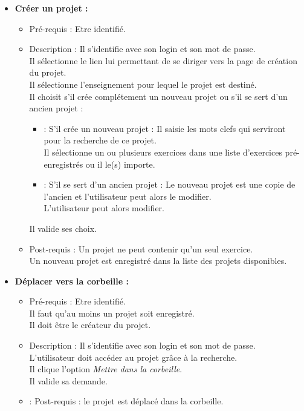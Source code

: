 \begin{itemize}
\item  {\bf Cr{\'e}er un projet :}
	\begin{itemize}
	\item Pr{\'e}-requis : Etre identifi{\'e}.
	\item Description : Il s'identifie avec son login et son mot de passe.\\
	Il s{\'e}lectionne le lien lui permettant de se diriger vers la page de cr{\'e}ation du projet.\\
	Il s{\'e}lectionne l'enseignement pour lequel le projet est destin{\'e}.\\
	Il choisit s'il cr{\'e}e compl{\'e}tement un nouveau projet ou s'il se sert d'un ancien projet :
	\begin{itemize}
		\item : S'il cr{\'e}e un nouveau projet : Il saisie les mots clefs qui serviront pour la recherche de ce projet.\\
		Il s{\'e}lectionne un ou plusieurs exercices dans une liste d'exercices pr{\'e}-enregistr{\'e}s ou il le(s) importe.
		\item : S'il se sert d'un ancien projet : Le nouveau projet est une copie de l'ancien et l'utilisateur peut alors le modifier.\\
		L'utilisateur peut alors modifier.
	\end{itemize}
	Il valide ses choix.
	\item Post-requis : Un projet ne peut contenir qu'un seul exercice.\\  
	Un nouveau projet est enregistr{\'e} dans la liste des projets disponibles.\\
	\end{itemize}

\item  {\bf D{\'e}placer vers la corbeille :}
	\begin{itemize}
	\item Pr{\'e}-requis : Etre identifi{\'e}.\\
	Il faut qu'au moins un projet soit enregistr{\'e}.\\
	Il doit {\^e}tre le cr{\'e}ateur du projet.
	\item Description : Il s'identifie avec son login et son mot de passe.\\
	L'utilisateur doit acc{\'e}der au projet gr{\^a}ce {\`a} la recherche.\\
	Il clique l'option {\it Mettre dans la corbeille}.\\
	Il valide sa demande.
	\item : Post-requis : le projet est d{\'e}plac{\'e} dans la corbeille.\\
	\end{itemize}
\end{itemize}

